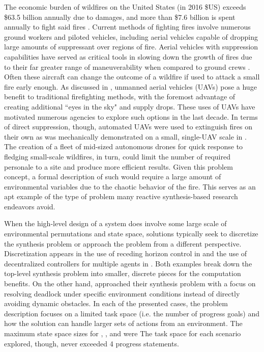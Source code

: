 \documentclass{ieeeaccess}
\begin{document}
The economic burden of wildfires on the United States (in 2016 \$US) exceeds \$63.5 billion annually due to damages, and more than \$7.6 billion is spent annually to fight said fires \cite{c0}. Current methods of fighting fires involve numerous ground workers and piloted vehicles, including aerial vehicles capable of dropping large amounts of suppressant over regions of fire. Aerial vehicles with suppression capabilities have served as critical tools in slowing down the growth of fires due to their far greater range of maneuverability when compared to ground crews \cite{c21}. Often these aircraft can change the outcome of a wildfire if used to attack a small fire early enough. As discussed in \cite{c1}, unmanned aerial vehicles (UAVs) pose a huge benefit to traditional firefighting methods, with the foremost advantage of creating additional ``eyes in the sky" and supply drops. These uses of UAVs have motivated numerous agencies to explore such options in the last decade. In terms of direct suppression, though, automated UAVs were used to extinguish fires on their own as was mechanically demonstrated on a small, single-UAV scale in \cite{c2}. The creation of a fleet of mid-sized autonomous drones for quick response to fledging small-scale wildfires, in turn, could limit the number of required personale to a site and produce more efficient results. Given this problem concept, a formal description of such would require a large amount of environmental variables due to the chaotic behavior of the fire. This serves as an apt example of the type of problem many reactive synthesis-based research endeavors avoid.

When the high-level design of a system does involve some large scale of environmental permutations and state space, solutions typically seek to discretize the synthesis problem or approach the problem from a different perspective. Discretization appears in the use of receding horizon control in \cite{c3} and the use of decentralized controllers for multiple agents in \cite{c4}. Both examples break down the top-level synthesis problem into smaller, discrete pieces for the computation benefits. On the other hand, \cite{c5} approached their synthesis problem with a focus on resolving deadlock under specific environment conditions instead of directly avoiding dynamic obstacles. In each of the presented cases, the problem description focuses on a limited task space (i.e. the number of progress goals) and how the solution can handle larger sets of actions from an environment. The maximum state space sizes for \cite{c3}, \cite{c4}, and \cite{c5} were  The task space for each scenario explored, though, never exceeded 4 progress statements.
\end{document}
